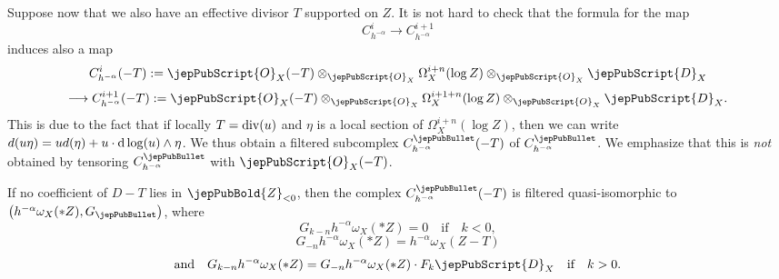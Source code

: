 Suppose now that we also have an effective divisor $T$ supported on $Z$. It is not hard to check that the formula for the map
$$C^i_{h^{-\alpha}}\longrightarrow C^{i+1}_{h^{-\alpha}}$$
induces also a map
$$C^i_{h^{-\alpha}}(-T):=\jepPubScript{O}_X(-T)\otimes_{\jepPubScript{O}_X}\Omega^{i+n}_X(\log Z)\otimes_{\jepPubScript{O}_X}\jepPubScript{D}_X$$
$$\longrightarrow 
C^{i+1}_{h^{-\alpha}}(-T):=\jepPubScript{O}_X(-T)\otimes_{\jepPubScript{O}_X}\Omega^{i+1+n}_X(\log Z)\otimes_{\jepPubScript{O}_X}\jepPubScript{D}_X.$$
This is due to the fact that if locally $T={\rm div}(u)$ and $\eta$ is a local section of $\Omega^{i+n}_X(\log Z)$,
then we can write 
$d(u\eta)=ud(\eta)+u\cdot {\rm d\log}(u)\wedge\eta$.
We thus obtain a filtered subcomplex $C^{\jepPubBullet}_{h^{-\alpha}}(-T)$ of $C^{\jepPubBullet}_{h^{-\alpha}}$.
We emphasize that this is \emph{not} obtained by tensoring $C^{\jepPubBullet}_{h^{-\alpha}}$ with $\jepPubScript{O}_X(-T)$.


\begin{proposition}\label{prop_SNC_complex}
If no coefficient of $D - T$ lies in $\jepPubBold{Z}_{<0}$, then
the complex $C^{\jepPubBullet}_{h^{-\alpha}}(-T)$
is filtered quasi-isomorphic to $\big(h^{-\alpha}\omega_X(*Z), G_\jepPubBullet \big)$, where 
$$G_{k-n}h^{-\alpha}\omega_X(*Z)=0\quad\text{if}\quad k<0,$$
$$G_{-n}h^{-\alpha}\omega_X(*Z)=h^{-\alpha}\omega_X(Z- T)$$
$$\text{and}\quad G_{k-n}h^{-\alpha}\omega_X(*Z)=G_{-n}h^{-\alpha}\omega_X(*Z)\cdot F_k\jepPubScript{D}_X\quad\text{if}\quad k>0.$$
\end{proposition}


